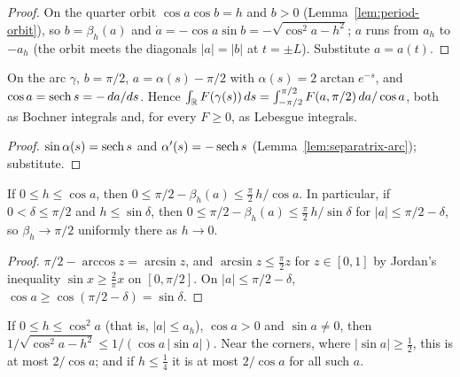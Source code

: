 \begin{proof}
\leanok
On the quarter orbit $\cos a\cos b=h$ and $b>0$ (Lemma~\ref{lem:period-orbit}), so
$b=\beta_h(a)$ and $\dot a=-\cos a\sin b=-\sqrt{\cos^2a-h^2}$; $a$ runs from $a_h$ to $-a_h$
(the orbit meets the diagonals $|a|=|b|$ at $t=\pm L$). Substitute $a=a(t)$.
\end{proof}

\begin{lemma}
\label{lem:arc-diagonal}
\leanok
On the arc $\gamma$, $b=\pi/2$, $a=\alpha(s)-\pi/2$ with $\alpha(s)=2\arctan e^{-s}$, and
$\cos a=\operatorname{sech} s=-\,da/ds$. Hence $\int_{\mathbb{R}} F(\gamma(s))\,ds=\int_{-\pi/2}^{\pi/2}F(a,\pi/2)\,da/\cos a$,
both as Bochner integrals and, for every $F\ge0$, as Lebesgue integrals.
\end{lemma}

\begin{proof}
\leanok
$\sin\alpha(s)=\operatorname{sech} s$ and $\alpha'(s)=-\operatorname{sech} s$ (Lemma~\ref{lem:separatrix-arc}); substitute.
\end{proof}

\begin{lemma}
\label{lem:quarter-height-limit}
\leanok
If $0\le h\le\cos a$, then $0\le\pi/2-\beta_h(a)\le\frac\pi2\,h/\cos a$. In particular, if
$0<\delta\le\pi/2$ and $h\le\sin\delta$, then $0\le\pi/2-\beta_h(a)\le\frac\pi2\,h/\sin\delta$ for
$|a|\le\pi/2-\delta$, so $\beta_h\to\pi/2$ uniformly there as $h\to0$.
\end{lemma}

\begin{proof}
\leanok
$\pi/2-\arccos z=\arcsin z$, and $\arcsin z\le\frac\pi2 z$ for $z\in[0,1]$ by Jordan's inequality
$\sin x\ge\frac2\pi x$ on $[0,\pi/2]$. On $|a|\le\pi/2-\delta$, $\cos a\ge\cos(\pi/2-\delta)=\sin\delta$.
\end{proof}

\begin{lemma}
\label{lem:quarter-weight}
\leanok
If $0\le h\le\cos^2a$ (that is, $|a|\le a_h$), $\cos a>0$ and $\sin a\ne0$, then
$1/\sqrt{\cos^2a-h^2}\le1/(\cos a\,|\sin a|)$. Near the corners, where $|\sin a|\ge\frac12$, this is
at most $2/\cos a$; and if $h\le\frac14$ it is at most $2/\cos a$ for all such $a$.
\end{lemma}

